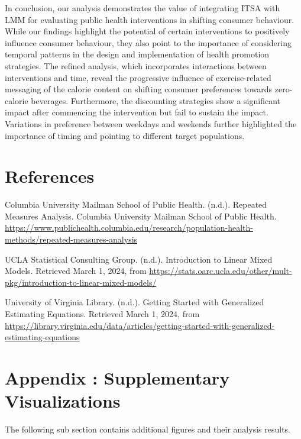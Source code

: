 \documentclass[
]{article}
\begin{document}
In conclusion, our analysis demonstrates the value of integrating ITSA with LMM for evaluating public health interventions in shifting consumer behaviour. While our findings highlight the potential of certain interventions to positively influence consumer behaviour, they also point to the importance of considering temporal patterns in the design and implementation of health promotion strategies. The refined analysis, which incorporates interactions between interventions and time, reveal the progressive influence of exercise-related messaging of the calorie content on shifting consumer preferences towards zero-calorie beverages. Furthermore, the discounting strategies show a significant impact after commencing the intervention but fail to sustain the impact. Variations in preference between weekdays and weekends further highlighted the importance of timing and pointing to different target populations.

\pagebreak

\hypertarget{references}{%
\section{References}\label{references}}

Columbia University Mailman School of Public Health. (n.d.). Repeated Measures Analysis. Columbia University Mailman School of Public Health. \url{https://www.publichealth.columbia.edu/research/population-health-methods/repeated-measures-analysis}

UCLA Statistical Consulting Group. (n.d.). Introduction to Linear Mixed Models. Retrieved March 1, 2024, from \url{https://stats.oarc.ucla.edu/other/mult-pkg/introduction-to-linear-mixed-models/}

University of Virginia Library. (n.d.). Getting Started with Generalized Estimating Equations. Retrieved March 1, 2024, from \url{https://library.virginia.edu/data/articles/getting-started-with-generalized-estimating-equations}

\hypertarget{appendix-appendix}{%
\appendix}


\hypertarget{appendix-supplementary-visualizations}{%
\section{Appendix : Supplementary Visualizations}\label{appendix-supplementary-visualizations}}

The following sub section contains additional figures and their analysis results.
\end{document}

